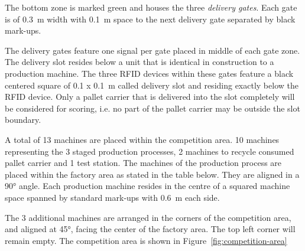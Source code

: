 \documentclass[12pt,twoside]{article}
\begin{document}
The bottom zone is marked green and houses the three \textit{delivery
  gates}.  Each gate is of \SI{0.3}{\metre} width with
\SI{0.1}{\metre} space to the next delivery gate separated by black
mark-ups.

The delivery gates feature one signal per gate placed in middle of
each gate zone. The delivery slot resides below a unit that is
identical in construction to a production machine. The three RFID
devices within these gates feature a black centered square of \SI{0.1
  x 0.1}{\metre} called delivery slot and residing exactly below the
RFID device. Only a pallet carrier that is delivered into the slot
completely will be considered for scoring, i.e. no part of the pallet
carrier may be outside the slot boundary.

A total of 13 machines are placed within the competition area. 10
machines representing the 3 staged production processes, 2 machines to
recycle consumed pallet carrier and 1 test station. The machines of
the production process are placed within the factory area as stated in
the table below. They are aligned in a \ang{90} angle. Each production
machine resides in the centre of a squared machine space spanned by
standard mark-ups with \SI{0.6}{\metre} each side.

The 3 additional machines are arranged in the corners of the
competition area, and aligned at \ang{45}, facing the center of the
factory area. The top left corner will remain empty. The competition
area is shown in Figure~\ref{fig:competition-area}
\end{document}
